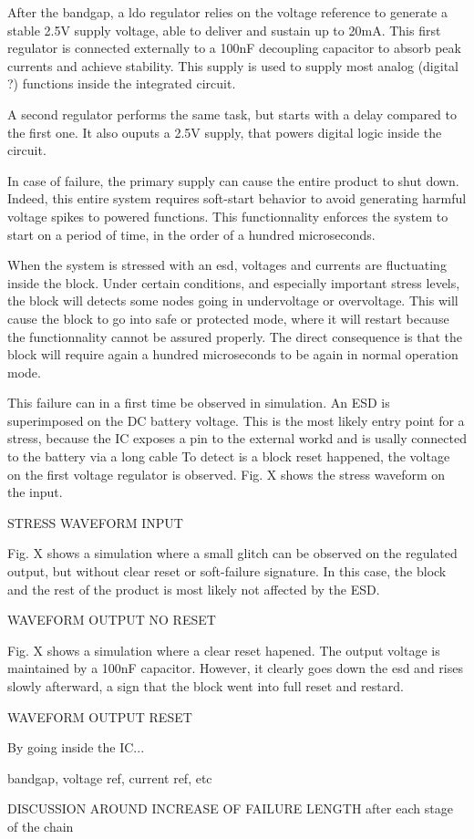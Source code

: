 After the bandgap, a \gls{ldo} regulator relies on the voltage reference to generate a stable 2.5V supply voltage, able to deliver and sustain up to 20mA.
This first regulator is connected externally to a 100nF decoupling capacitor to absorb peak currents and achieve stability.
This supply is used to supply most analog (digital ?) functions inside the integrated circuit.

A second regulator performs the same task, but starts with a delay compared to the first one.
It also ouputs a 2.5V supply, that powers digital logic inside the circuit.

In case of failure, the primary supply can cause the entire product to shut down.
Indeed, this entire system requires soft-start behavior to avoid generating harmful voltage spikes to powered functions.
This functionnality enforces the system to start on a  period of time, in the order of a hundred microseconds.

When the system is stressed with an \gls{esd}, voltages and currents are fluctuating inside the block.
Under certain conditions, and especially important stress levels, the block will detects some nodes going in undervoltage or overvoltage.
This will cause the block to go into safe or protected mode, where it will restart because the functionnality cannot be assured properly.
The direct consequence is that the block will require again a hundred microseconds to be again in normal operation mode.

This failure can in a first time be observed in simulation.
An \gls{ESD} is superimposed on the DC battery voltage.
This is the most likely entry point for a stress, because the \gls{IC} exposes a pin to the external workd and is usally connected to the battery via a long cable
To detect is a block reset happened, the voltage on the first voltage regulator is observed.
Fig. X shows the stress waveform on the input.

STRESS WAVEFORM INPUT

Fig. X shows a simulation where a small glitch can be observed on the regulated output, but without clear reset or soft-failure signature.
In this case, the block and the rest of the product is most likely not affected by the ESD.

WAVEFORM OUTPUT NO RESET

Fig. X shows a simulation where a clear reset hapened.
The output voltage is maintained by a 100nF capacitor.
However, it clearly goes down  the \gls{esd} and rises slowly afterward, a sign that the block went into full reset and restard.

WAVEFORM OUTPUT RESET

By going inside the \gls{IC}...

bandgap, voltage ref, current ref, etc

DISCUSSION AROUND INCREASE OF FAILURE LENGTH after each stage of the chain
